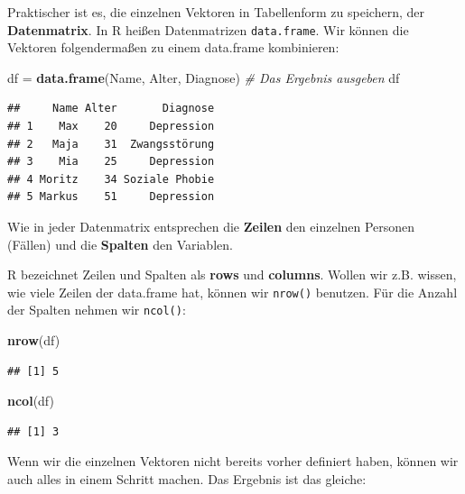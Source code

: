 \documentclass[
]{book}
\newenvironment{Shaded}{\begin{snugshade}}{\end{snugshade}}
\newcommand{\CommentTok}[1]{\textcolor[rgb]{0.56,0.35,0.01}{\textit{#1}}}
\newcommand{\FunctionTok}[1]{\textcolor[rgb]{0.13,0.29,0.53}{\textbf{#1}}}
\newcommand{\NormalTok}[1]{#1}
\newcommand{\OtherTok}[1]{\textcolor[rgb]{0.56,0.35,0.01}{#1}}
\begin{document}
Praktischer ist es, die einzelnen Vektoren in Tabellenform zu speichern, der \textbf{Datenmatrix}. In R heißen Datenmatrizen \texttt{data.frame}. Wir können die Vektoren folgendermaßen zu einem data.frame kombinieren:

\begin{Shaded}
\begin{Highlighting}[]
\NormalTok{df }\OtherTok{=} \FunctionTok{data.frame}\NormalTok{(Name, Alter, Diagnose)}
\CommentTok{\# Das Ergebnis ausgeben}
\NormalTok{df}
\end{Highlighting}
\end{Shaded}

\begin{verbatim}
##     Name Alter       Diagnose
## 1    Max    20     Depression
## 2   Maja    31  Zwangsstörung
## 3    Mia    25     Depression
## 4 Moritz    34 Soziale Phobie
## 5 Markus    51     Depression
\end{verbatim}

Wie in jeder Datenmatrix entsprechen die \textbf{Zeilen} den einzelnen Personen (Fällen) und die \textbf{Spalten} den Variablen.

R bezeichnet Zeilen und Spalten als \textbf{rows} und \textbf{columns}. Wollen wir z.B. wissen, wie viele Zeilen der data.frame hat, können wir \texttt{nrow()} benutzen. Für die Anzahl der Spalten nehmen wir \texttt{ncol()}:

\begin{Shaded}
\begin{Highlighting}[]
\FunctionTok{nrow}\NormalTok{(df)}
\end{Highlighting}
\end{Shaded}

\begin{verbatim}
## [1] 5
\end{verbatim}

\begin{Shaded}
\begin{Highlighting}[]
\FunctionTok{ncol}\NormalTok{(df)}
\end{Highlighting}
\end{Shaded}

\begin{verbatim}
## [1] 3
\end{verbatim}

Wenn wir die einzelnen Vektoren nicht bereits vorher definiert haben, können wir auch alles in einem Schritt machen. Das Ergebnis ist das gleiche:
\end{document}
